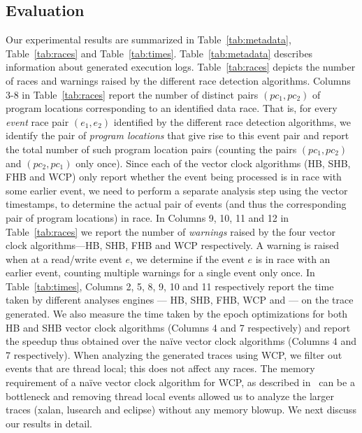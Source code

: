 
\subsection{Evaluation}




Our experimental results are summarized in
Table~\ref{tab:metadata}, Table~\ref{tab:races} and Table~\ref{tab:times}. 
Table~\ref{tab:metadata} describes information about
generated execution logs.
Table~\ref{tab:races} depicts the number of races and warnings
raised by the different race detection algorithms.
Columns 3-8 in Table~\ref{tab:races} report the number of distinct pairs
$(pc_1, pc_2)$ of program locations corresponding
to an identified data race.
That is, for every \emph{event} race pair $(e_1, e_2)$ identified by the different
race detection algorithms, we identify the pair of \emph{program locations}
that give rise to this event pair and report the total
number of such program location pairs (counting the
pairs $(pc_1, pc_2)$ and $(pc_2, pc_1)$ only once).
Since each of the vector clock algorithms (HB, SHB, FHB and WCP)
only report whether the event being processed is in race
with some earlier event, we need to perform a separate analysis step
using the vector timestamps, to determine the actual pair of events
(and thus the corresponding pair of program locations) in race.
In Columns 9, 10, 11 and 12 in Table~\ref{tab:races} we report the number of \emph{warnings}
raised by the four vector clock algorithms---HB, SHB, FHB and WCP respectively.
A warning is raised when at a read/write event $e$, we determine if
the event $e$ is in race with an earlier event, 
counting multiple warnings for a single event only once.
In Table~\ref{tab:times}, Columns 2, 5, 8, 9, 10 and 11 respectively
report the time taken by
different analyses engines --- HB, SHB, FHB, WCP and \rvpredict--- on the trace generated.
We also measure the time taken by the epoch optimizations
for both HB and SHB vector clock algorithms (Columns 4 and 7 respectively)
and report the speedup thus obtained over the na\"ive vector clock algorithms 
(Columns 4 and 7 respectively). 
When analyzing the generated traces using WCP, we filter out events
that are thread local; this does not affect any races.
The memory requirement of a na\"ive vector clock algorithm for WCP, 
as described in~\cite{wcp2017} can be a bottleneck and
removing thread local events allowed us to analyze the larger traces 
(\textsf{xalan}, \textsf{lusearch} and \textsf{eclipse}) without any memory blowup.
We next discuss our results in detail.

